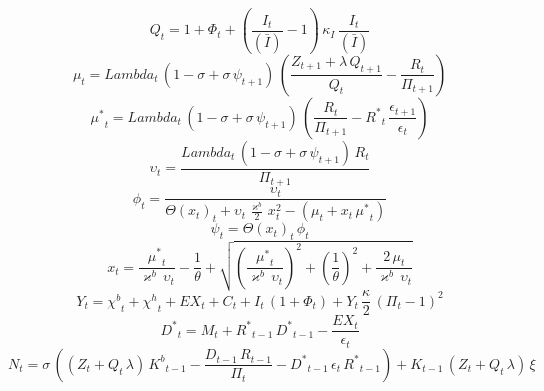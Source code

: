 \begin{dmath}
{Q}_{t}=1+{\Phi}_{t}+\left(\frac{{I}_{t}}{(\bar{I})}-1\right)\, {\kappa_{I}}\, \frac{{I}_{t}}{(\bar{I})}
\end{dmath}
\begin{dmath}
{\mu}_{t}={Lambda}_{t}\, \left(1-{\sigma}+{\sigma}\, {\psi}_{t+1}\right)\, \left(\frac{{Z}_{t+1}+{\lambda}\, {Q}_{t+1}}{{Q}_{t}}-\frac{{R}_{t}}{{\Pi}_{t+1}}\right)
\end{dmath}
\begin{dmath}
{\mu^{*}}_{t}={Lambda}_{t}\, \left(1-{\sigma}+{\sigma}\, {\psi}_{t+1}\right)\, \left(\frac{{R}_{t}}{{\Pi}_{t+1}}-{R^{*}}_{t}\, \frac{{\epsilon}_{t+1}}{{\epsilon}_{t}}\right)
\end{dmath}
\begin{dmath}
{\upsilon}_{t}=\frac{{Lambda}_{t}\, \left(1-{\sigma}+{\sigma}\, {\psi}_{t+1}\right)\, {R}_{t}}{{\Pi}_{t+1}}
\end{dmath}
\begin{dmath}
{\phi}_{t}=\frac{{\upsilon}_{t}}{{\Theta(x_{t})}_{t}+{\upsilon}_{t}\, \frac{{\varkappa^{b}}}{2}\, {x}_{t}^{2}-\left({\mu}_{t}+{x}_{t}\, {\mu^{*}}_{t}\right)}
\end{dmath}
\begin{dmath}
{\psi}_{t}={\Theta(x_{t})}_{t}\, {\phi}_{t}
\end{dmath}
\begin{dmath}
{x}_{t}=\frac{{\mu^{*}}_{t}}{{\varkappa^{b}}\, {\upsilon}_{t}}-\frac{1}{{\theta}}+\sqrt{\left(\frac{{\mu^{*}}_{t}}{{\varkappa^{b}}\, {\upsilon}_{t}}\right)^{2}+\left(\frac{1}{{\theta}}\right)^{2}+\frac{2\, {\mu}_{t}}{{\varkappa^{b}}\, {\upsilon}_{t}}}
\end{dmath}
\begin{dmath}
{Y}_{t}={\chi^{b}}_{t}+{\chi^{h}}_{t}+{EX}_{t}+{C}_{t}+{I}_{t}\, \left(1+{\Phi}_{t}\right)+{Y}_{t}\, \frac{{\kappa}}{2}\, \left({\Pi}_{t}-1\right)^{2}
\end{dmath}
\begin{dmath}
{D^{*}}_{t}={M}_{t}+{R^{*}}_{t-1}\, {D^{*}}_{t-1}-\frac{{EX}_{t}}{{\epsilon}_{t}}
\end{dmath}
\begin{dmath}
{N}_{t}={\sigma}\, \left(\left({Z}_{t}+{Q}_{t}\, {\lambda}\right)\, {K^{b}}_{t-1}-\frac{{D}_{t-1}\, {R}_{t-1}}{{\Pi}_{t}}-{D^{*}}_{t-1}\, {\epsilon}_{t}\, {R^{*}}_{t-1}\right)+{K}_{t-1}\, \left({Z}_{t}+{Q}_{t}\, {\lambda}\right)\, {\xi}
\end{dmath}
